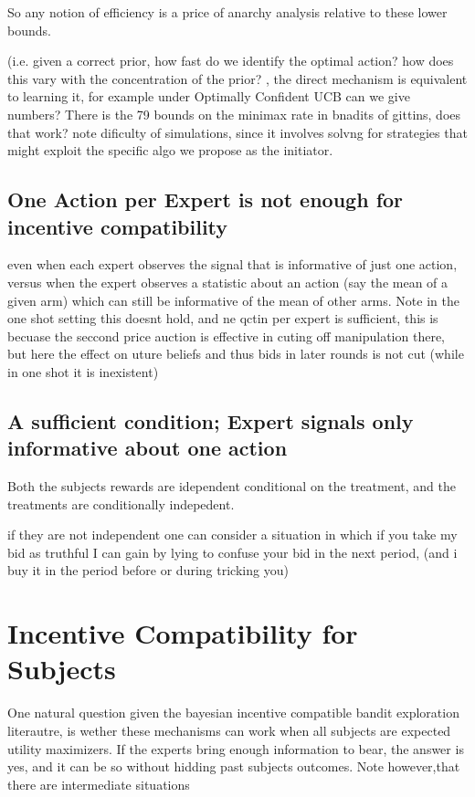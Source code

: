 So any notion of efficiency is a price of anarchy analysis relative to these lower bounds. 

(i.e. given a correct prior, how fast do we identify the optimal action? how does this vary with the concentration of the prior? , the direct mechanism is equivalent to learning it, for example under Optimally Confident UCB can we give numbers? There is the 79 bounds on the minimax rate in bnadits of gittins, does that work? note dificulty of simulations, since it involves solvng for strategies that might exploit the specific algo we propose as the initiator.

\subsection{One Action per Expert is not enough for incentive compatibility}

even when each expert observes the signal that is informative of just one action, versus when the expert observes a statistic about an action (say the mean of a given arm) which can still be informative of the mean of other arms. Note in the one shot setting this doesnt hold, and ne qctin per expert is sufficient, this is becuase the seccond price auction is effective in cuting off manipulation there, but here the effect on uture beliefs and thus bids in later rounds is not cut (while in one shot it is inexistent)

\subsection{A sufficient condition; Expert signals only informative about one action}

Both the subjects rewards are idependent conditional on the treatment, and the treatments are conditionally indepedent.

if they are not independent one can consider a situation in which if you take my bid as truthful I can gain by lying to confuse your bid in the next period, (and i buy it in the period before or during tricking you)




\section{Incentive Compatibility for Subjects}

One natural question given the bayesian incentive compatible bandit exploration literautre, is wether these mechanisms can work when all subjects are expected utility maximizers. If the experts bring enough information to bear, the answer is yes, and it can be so without hidding past subjects outcomes. Note however,that there are intermediate situations 

